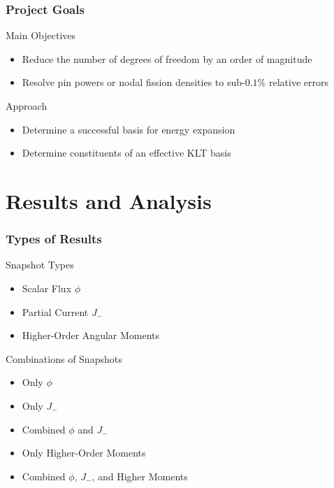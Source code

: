 \documentclass[fleqn]{beamer}
\begin{document}
  \begin{frame}
      \frametitle{Project Goals}
      \begin{block}{Main Objectives}
          \begin{itemize}
              \item Reduce the number of degrees of freedom by an order of 
              magnitude
              \item Resolve pin powers or nodal fission densities to 
              sub-$0.1\%$ relative errors
          \end{itemize}
      \end{block}
      \begin{block}{Approach}
          \begin{itemize}
              \item Determine a successful basis for energy expansion
              \item Determine constituents of an effective KLT basis
          \end{itemize}
      \end{block}
  \end{frame}
  
  \section{Results and Analysis}
  
  \begin{frame}
      \frametitle{Types of Results}
      \begin{block}{Snapshot Types}
          \begin{itemize}
              \item Scalar Flux $\phi$
              \item Partial Current $J_-$
              \item Higher-Order Angular Moments
          \end{itemize}

      \end{block}
      \begin{block}{Combinations of Snapshots}
          \begin{itemize}
              \item Only $\phi$
              \item Only $J_-$
              \item Combined $\phi$ and $J_-$
              \item Only Higher-Order Moments
              \item Combined $\phi$, $J_-$, and Higher Moments
          \end{itemize}

      \end{block}

  \end{frame}
\end{document}
